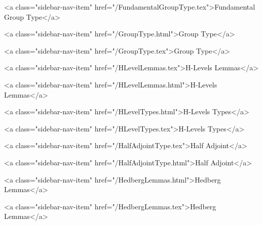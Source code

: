       
        
          <a class="sidebar-nav-item" href="/FundamentalGroupType.tex">Fundamental Group Type</a>
        
      
    
      
        
          <a class="sidebar-nav-item" href="/GroupType.html">Group Type</a>
        
      
    
      
        
          <a class="sidebar-nav-item" href="/GroupType.tex">Group Type</a>
        
      
    
      
        
          <a class="sidebar-nav-item" href="/HLevelLemmas.tex">H-Levels Lemmas</a>
        
      
    
      
        
          <a class="sidebar-nav-item" href="/HLevelLemmas.html">H-Levels Lemmas</a>
        
      
    
      
        
          <a class="sidebar-nav-item" href="/HLevelTypes.html">H-Levels Types</a>
        
      
    
      
        
          <a class="sidebar-nav-item" href="/HLevelTypes.tex">H-Levels Types</a>
        
      
    
      
        
          <a class="sidebar-nav-item" href="/HalfAdjointType.tex">Half Adjoint</a>
        
      
    
      
        
          <a class="sidebar-nav-item" href="/HalfAdjointType.html">Half Adjoint</a>
        
      
    
      
        
          <a class="sidebar-nav-item" href="/HedbergLemmas.html">Hedberg Lemmas</a>
        
      
    
      
        
          <a class="sidebar-nav-item" href="/HedbergLemmas.tex">Hedberg Lemmas</a>
        
      
    
